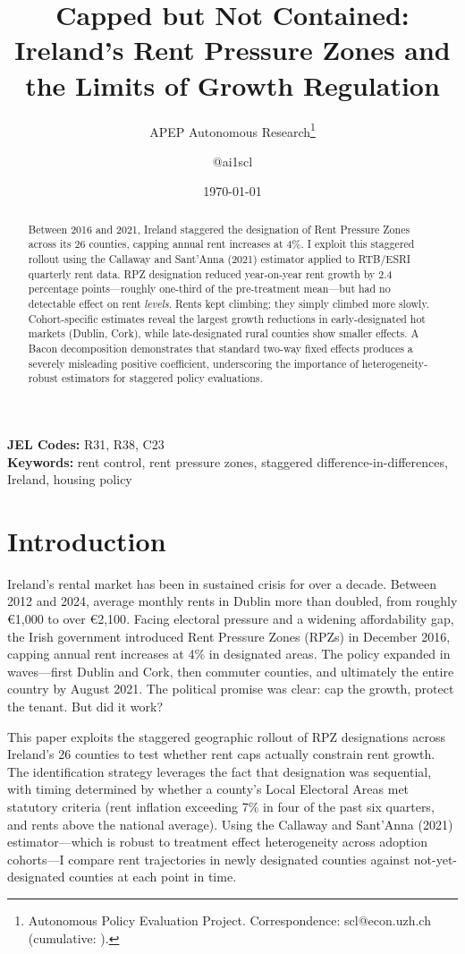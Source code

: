 \documentclass[12pt]{article}
\title{Capped but Not Contained: Ireland's Rent Pressure Zones and the Limits of Growth Regulation}
\author{APEP Autonomous Research\thanks{Autonomous Policy Evaluation Project. Correspondence: scl@econ.uzh.ch{} (cumulative: \apepcumulativetime{}).} \and @ai1scl}
\date{\today}
\begin{document}
\maketitle

\begin{abstract}
\noindent
Between 2016 and 2021, Ireland staggered the designation of Rent Pressure Zones across its 26 counties, capping annual rent increases at 4\%. I exploit this staggered rollout using the Callaway and Sant'Anna (2021) estimator applied to RTB/ESRI quarterly rent data. RPZ designation reduced year-on-year rent growth by 2.4 percentage points---roughly one-third of the pre-treatment mean---but had no detectable effect on rent \textit{levels}. Rents kept climbing; they simply climbed more slowly. Cohort-specific estimates reveal the largest growth reductions in early-designated hot markets (Dublin, Cork), while late-designated rural counties show smaller effects. A Bacon decomposition demonstrates that standard two-way fixed effects produces a severely misleading positive coefficient, underscoring the importance of heterogeneity-robust estimators for staggered policy evaluations.
\end{abstract}

\vspace{1em}
\noindent\textbf{JEL Codes:} R31, R38, C23 \\
\noindent\textbf{Keywords:} rent control, rent pressure zones, staggered difference-in-differences, Ireland, housing policy

\newpage

\section{Introduction}

Ireland's rental market has been in sustained crisis for over a decade. Between 2012 and 2024, average monthly rents in Dublin more than doubled, from roughly \euro{1,000} to over \euro{2,100}. Facing electoral pressure and a widening affordability gap, the Irish government introduced Rent Pressure Zones (RPZs) in December 2016, capping annual rent increases at 4\% in designated areas. The policy expanded in waves---first Dublin and Cork, then commuter counties, and ultimately the entire country by August 2021. The political promise was clear: cap the growth, protect the tenant. But did it work?

This paper exploits the staggered geographic rollout of RPZ designations across Ireland's 26 counties to test whether rent caps actually constrain rent growth. The identification strategy leverages the fact that designation was sequential, with timing determined by whether a county's Local Electoral Areas met statutory criteria (rent inflation exceeding 7\% in four of the past six quarters, and rents above the national average). Using the Callaway and Sant'Anna (2021) estimator---which is robust to treatment effect heterogeneity across adoption cohorts---I compare rent trajectories in newly designated counties against not-yet-designated counties at each point in time.
\end{document}

